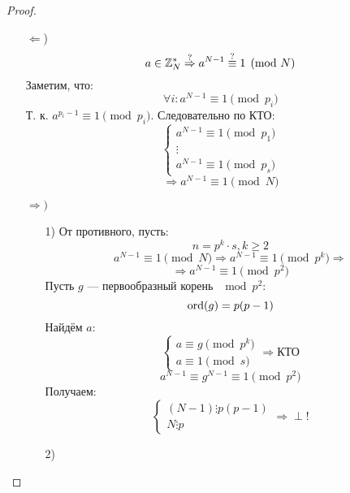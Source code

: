 \begin{proof}
    \begin{itemize}
        \item [$\Leftarrow$)]
            \[
                a \in \mathbb{Z}_{N}^{*} \overset{?}{\Rightarrow} a^{N - 1} \overset{?}{\equiv} 1 \pmod N
            \]
            Заметим, что:
            \[
            \forall i \colon a^{N - 1} \equiv 1 \pmod p_i
            \]
            Т. к. $a^{p_i - 1} \equiv 1 \pmod p_i$. Следовательно по КТО:
            \[
            \begin{cases}
            a^{N - 1} \equiv 1 \pmod p_1 \\
            \vdots \\
            a^{N - 1} \equiv 1 \pmod p_s
            \end{cases}
            \]
            \[
            \Rightarrow a^{N - 1} \equiv 1 \pmod N
            \]
        \item [$\Rightarrow)$]
            \begin{itemize}
                \item [1) ] От противного, пусть:
                    \[
                    n = p ^{k} \cdot s, k\geq 2
                    \]
                    \[
                    a^{N - 1} \equiv 1 \pmod N \Rightarrow a^{N - 1} \equiv 1 \pmod p ^{k} \Rightarrow 
                    \]
                    \[
                    \Rightarrow a^{N - 1} \equiv 1 \pmod p ^{2}
                    \]
                    Пусть $g$ --- первообразный корень $\mod p ^{2}$:
                    \[
                   \operatorname{ord} (g) = p (p - 1)
                    \]
                    Найдём $a\colon$
                    \[
                    \begin{cases}
                    a \equiv g \pmod p ^{k} \\
                    a \equiv 1 \pmod s
                    \end{cases} \Rightarrow \text{КТО}
                    \]
                    \[
                    a^{N - 1} \equiv g^{N - 1} \equiv 1 \pmod p ^{2}
                    \]
                    Получаем:
                    \[
                    \begin{cases}
                        (N - 1) \vdots p(p - 1) \\
                        N \vdots p
                    \end{cases} \Rightarrow \perp!
                    \]
                \item [2) ]
                    \[
\]
\end{itemize}
\end{itemize}
\end{proof}
